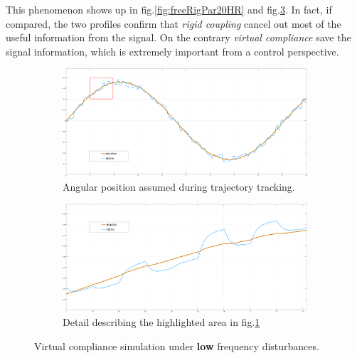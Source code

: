 This phenomenon shows up in fig.\ref{fig:freeRigPar20HR} and fig.\ref{fig:freeSetPar20HR}.
In fact, if compared, the two profiles confirm that \textsl{rigid coupling}
cancel out most of the useful information from the signal.
\newline
On the contrary \textsl{virtual compliance} save the signal information,
which is extremely important from a control perspective.



  
\begin{figure}[h]
	\begin{subfigure}[h!]{1\linewidth}
		\centering
		\includegraphics[width=\textwidth, height=0.48\textwidth]{Images/freeSet20Tot20HtznoiseRect}
		\caption{Angular position assumed during trajectory tracking.}
		\label{fig:freeSetTot20HR}
	\end{subfigure}	
  \newline
	\begin{subfigure}[h!]{1\linewidth}
		\centering
		\includegraphics[width=\textwidth, height=0.48\textwidth]{Images/freeSet20Part20Htznoise}
		\caption{Detail describing the highlighted area in fig.\ref{fig:freeSetTot20HR}}
		\label{fig:freeSetPar20HR}
	\end{subfigure}	
  \caption{ Virtual compliance simulation under \textbf{low} frequency disturbances.}
\end{figure}

